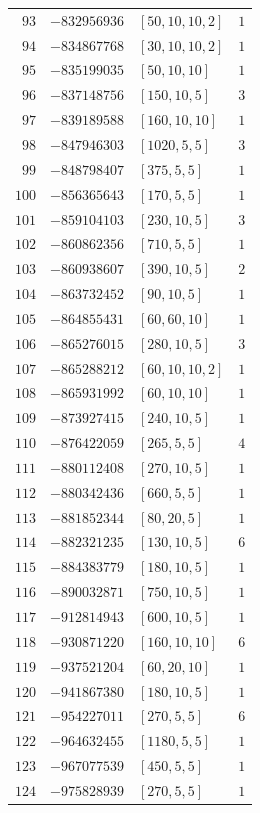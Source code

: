 \documentclass[11pt]{article}
\begin{document}
\begin{center}
\begin{longtable}{r r l c}
$93$ & $-832956936$ & $[50,10,10,2]$ & $1$\\
$94$ & $-834867768$ & $[30,10,10,2]$ & $1$\\
$95$ & $-835199035$ & $[50,10,10]$ & $1$\\
$96$ & $-837148756$ & $[150,10,5]$ & $3$\\
$97$ & $-839189588$ & $[160,10,10]$ & $1$\\
$98$ & $-847946303$ & $[1020,5,5]$ & $3$\\
$99$ & $-848798407$ & $[375,5,5]$ & $1$\\
$100$ & $-856365643$ & $[170,5,5]$ & $1$\\
$101$ & $-859104103$ & $[230,10,5]$ & $3$\\
$102$ & $-860862356$ & $[710,5,5]$ & $1$\\
$103$ & $-860938607$ & $[390,10,5]$ & $2$\\
$104$ & $-863732452$ & $[90,10,5]$ & $1$\\
$105$ & $-864855431$ & $[60,60,10]$ & $1$\\
$106$ & $-865276015$ & $[280,10,5]$ & $3$\\
$107$ & $-865288212$ & $[60,10,10,2]$ & $1$\\
$108$ & $-865931992$ & $[60,10,10]$ & $1$\\
$109$ & $-873927415$ & $[240,10,5]$ & $1$\\
$110$ & $-876422059$ & $[265,5,5]$ & $4$\\
$111$ & $-880112408$ & $[270,10,5]$ & $1$\\
$112$ & $-880342436$ & $[660,5,5]$ & $1$\\
$113$ & $-881852344$ & $[80,20,5]$ & $1$\\
$114$ & $-882321235$ & $[130,10,5]$ & $6$\\
$115$ & $-884383779$ & $[180,10,5]$ & $1$\\
$116$ & $-890032871$ & $[750,10,5]$ & $1$\\
$117$ & $-912814943$ & $[600,10,5]$ & $1$\\
$118$ & $-930871220$ & $[160,10,10]$ & $6$\\
$119$ & $-937521204$ & $[60,20,10]$ & $1$\\
$120$ & $-941867380$ & $[180,10,5]$ & $1$\\
$121$ & $-954227011$ & $[270,5,5]$ & $6$\\
$122$ & $-964632455$ & $[1180,5,5]$ & $1$\\
$123$ & $-967077539$ & $[450,5,5]$ & $1$\\
$124$ & $-975828939$ & $[270,5,5]$ & $1$\\

\end{longtable}
\end{center}
\end{document}
